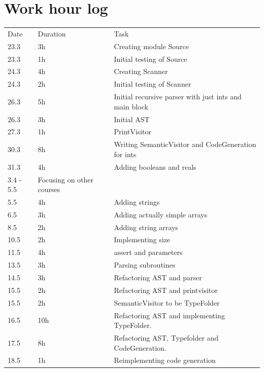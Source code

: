 \documentclass[12pt,a4paper]{article}
\begin{document}
\section{Work hour log}
\begin{center}
  \begin{tabular}{l l l}
    \bottomrule
    Date & Duration & Task \\
    23.3 & 3h & Creating module Source \\
    \bottomrule
    23.3 & 1h & Initial testing of Source \\
    \bottomrule
    24.3 & 4h & Creating Scanner \\
    \bottomrule
    24.3 & 2h & Initial testing of Scanner \\
    \bottomrule
    26.3 & 5h & Initial recursive parser with just ints and main block\\
    \bottomrule
    26.3 & 3h & Initial AST \\
    \bottomrule
    27.3 & 1h & PrintVisitor \\
    \bottomrule
    30.3 & 8h & Writing SemanticVisitor and CodeGeneration for ints\\
    \bottomrule
    31.3 & 4h & Adding booleans and reals \\
    \bottomrule
    3.4 - 5.5 & Focusing on other courses \\
    \bottomrule
    5.5 & 4h & Adding strings \\
    \bottomrule
    6.5 & 3h & Adding actually simple arrays \\
    \bottomrule
    8.5 & 2h & Adding string arrays \\
    \bottomrule
    10.5 & 2h & Implementing size \\
    \bottomrule
    11.5 & 4h & assert and parameters \\
    \bottomrule
    13.5 & 3h & Parsing subroutines \\
    \bottomrule
    14.5 & 3h & Refactoring AST and parser \\
    \bottomrule
    15.5 & 2h & Refactoring AST and printvisitor\\
    \bottomrule
    15.5 & 2h & SemanticVisitor to be TypeFolder\\
    \bottomrule
    16.5 & 10h & Refactoring AST and implementing TypeFolder.\\
    \bottomrule
    17.5 & 8h & Refactoring AST, Typefolder and CodeGeneration.\\
    \bottomrule
    18.5 & 1h & Reimplementing code generation\\

\end{tabular}
\end{center}
\end{document}
